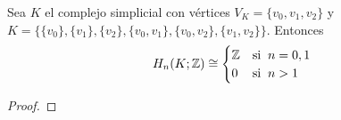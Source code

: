 \begin{ejercicio}\label{ej:58}
  Sea $K$ el complejo simplicial con v\'ertices $V_K=\{v_0,v_1,v_2\}$ y
  $K=\{\{v_0\},\{v_1\},\{v_2\},\{v_0,v_1\},\{v_0,v_2\},\{v_1,v_2\}\}$. Entonces
  \[
    H_n(K;\ZZ)\cong%
	\begin{cases}
	  \ZZ & \text{si}\;\; n=0,1 \\
	  0   & \text{si}\;\; n>1
	\end{cases}
  \]
\end{ejercicio}
\begin{proof}%

\end{proof}%

